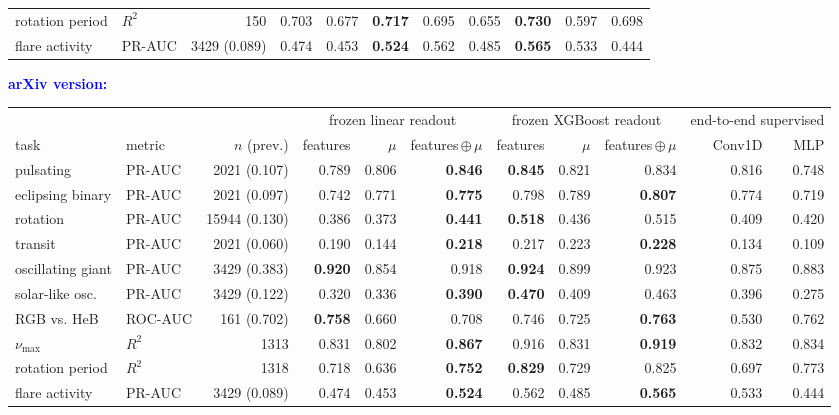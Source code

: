 \documentclass{article}
\providecommand{\DIFaddbeginFL}{} %
\providecommand{\DIFaddendFL}{} %
\providecommand{\DIFdelendFL}{} %
\providecommand{\DIFaddincludegraphics}[2][]{{\color{blue}\fbox{\DIFOincludegraphics[#1]{#2}}}} %
\DeclareRobustCommand{\DIFaddbeginFL}{\DIFOaddbeginFL \let\includegraphics\DIFaddincludegraphics} %
\DeclareRobustCommand{\DIFaddendFL}{\DIFOaddendFL \let\includegraphics\DIFOincludegraphics} %
\DeclareRobustCommand{\DIFdelendFL}{\DIFOaddendFL \let\includegraphics\DIFOincludegraphics} %
\begin{document}
\begin{table}[t]
\begin{tabular}{llrrrrrrrrr}
rotation period & $R^2$ & 150 & 0.703 & 0.677 & \textbf{0.717} & 0.695 & 0.655 & \textbf{0.730} & 0.597 & 0.698 \\
flare activity & PR-AUC & 3429 (0.089) & 0.474 & 0.453 & \textbf{0.524} & 0.562 & 0.485 & \textbf{0.565} & 0.533 & 0.444 \\
\bottomrule
\end{tabular}
\endgroup\par\medskip
{\scriptsize\textcolor{blue}{\textbf{arXiv version:}}}\par\nobreak\smallskip
\DIFdelendFL \DIFaddbeginFL \begin{tabular}{llrrrrrrrrr}
\toprule
 & & & \multicolumn{3}{c}{frozen linear readout} & \multicolumn{3}{c}{frozen XGBoost readout} & \multicolumn{2}{c}{end-to-end supervised} \\
\cmidrule(lr){4-6}\cmidrule(lr){7-9}\cmidrule(lr){10-11}
task & metric & $n$ (prev.) & features & $\mu$ & features\,$\oplus$\,$\mu$ & features & $\mu$ & features\,$\oplus$\,$\mu$ & Conv1D & MLP \\
\midrule
pulsating & PR-AUC & 2021 (0.107) & 0.789 & 0.806 & \textbf{0.846} & \textbf{0.845} & 0.821 & 0.834 & 0.816 & 0.748 \\
eclipsing binary & PR-AUC & 2021 (0.097) & 0.742 & 0.771 & \textbf{0.775} & 0.798 & 0.789 & \textbf{0.807} & 0.774 & 0.719 \\
rotation & PR-AUC & 15944 (0.130) & 0.386 & 0.373 & \textbf{0.441} & \textbf{0.518} & 0.436 & 0.515 & 0.409 & 0.420 \\
transit & PR-AUC & 2021 (0.060) & 0.190 & 0.144 & \textbf{0.218} & 0.217 & 0.223 & \textbf{0.228} & 0.134 & 0.109 \\
oscillating giant & PR-AUC & 3429 (0.383) & \textbf{0.920} & 0.854 & 0.918 & \textbf{0.924} & 0.899 & 0.923 & 0.875 & 0.883 \\
solar-like osc. & PR-AUC & 3429 (0.122) & 0.320 & 0.336 & \textbf{0.390} & \textbf{0.470} & 0.409 & 0.463 & 0.396 & 0.275 \\
RGB vs. HeB & ROC-AUC & 161 (0.702) & \textbf{0.758} & 0.660 & 0.708 & 0.746 & 0.725 & \textbf{0.763} & 0.530 & 0.762 \\
$\nu_{\max}$ & $R^2$ & 1313 & 0.831 & 0.802 & \textbf{0.867} & 0.916 & 0.831 & \textbf{0.919} & 0.832 & 0.834 \\
rotation period & $R^2$ & 1318 & 0.718 & 0.636 & \textbf{0.752} & \textbf{0.829} & 0.729 & 0.825 & 0.697 & 0.773 \\
flare activity & PR-AUC & 3429 (0.089) & 0.474 & 0.453 & \textbf{0.524} & 0.562 & 0.485 & \textbf{0.565} & 0.533 & 0.444 \\
\bottomrule
\end{tabular}
\DIFaddendFL 

\end{table}
\end{document}
